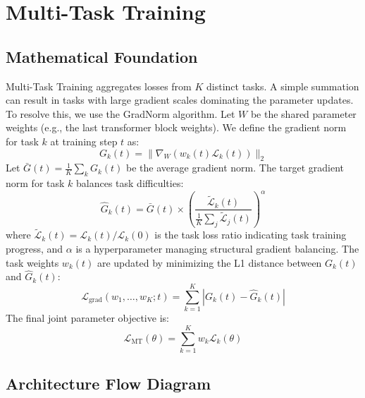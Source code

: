 \documentclass{article}
\begin{document}
\newpage
\section{Multi-Task Training}

\subsection{Mathematical Foundation}
Multi-Task Training aggregates losses from $K$ distinct tasks. A simple summation can result in tasks with large gradient scales dominating the parameter updates. To resolve this, we use the GradNorm algorithm. Let $W$ be the shared parameter weights (e.g., the last transformer block weights). We define the gradient norm for task $k$ at training step $t$ as:
\begin{equation}
  G_k(t) = \|\nabla_W (w_k(t) \mathcal{L}_k(t))\|_2
\end{equation}
Let $\bar{G}(t) = \frac{1}{K} \sum_k G_k(t)$ be the average gradient norm. The target gradient norm for task $k$ balances task difficulties:
\begin{equation}
  \hat{G}_k(t) = \bar{G}(t) \times \left( \frac{\tilde{\mathcal{L}}_k(t)}{\frac{1}{K}\sum_j \tilde{\mathcal{L}}_j(t)} \right)^\alpha
\end{equation}
where $\tilde{\mathcal{L}}_k(t) = \mathcal{L}_k(t) / \mathcal{L}_k(0)$ is the task loss ratio indicating task training progress, and $\alpha$ is a hyperparameter managing structural gradient balancing. The task weights $w_k(t)$ are updated by minimizing the L1 distance between $G_k(t)$ and $\hat{G}_k(t)$:
\begin{equation}
  \mathcal{L}_{\text{grad}}(w_1, \dots, w_K; t) = \sum_{k=1}^K \left| G_k(t) - \hat{G}_k(t) \right|
\end{equation}
The final joint parameter objective is:
\begin{equation}
  \mathcal{L}_{\text{MT}}(\theta) = \sum_{k=1}^K w_k \mathcal{L}_k(\theta)
\end{equation}

\subsection{Architecture Flow Diagram}
\end{document}
